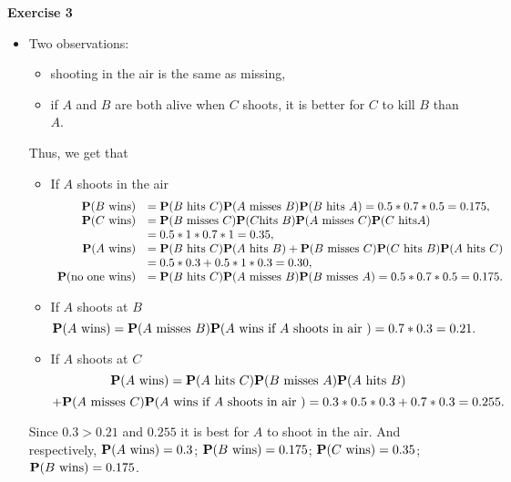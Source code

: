 \documentclass[10pt]{article}
\def\Pr{{\bf P}}
\begin{document}
{\bf Exercise 3}
\begin{itemize}
\item[\empty] Two observations:
\begin{itemize}
\item shooting in the air is the same as missing,
\item if $A$ and $B$ are both alive when $C$ shoots, it is better for $C$ to kill $B$ than $A$.
\end{itemize}
 
Thus, we get that
\begin{itemize}
\item If $A$ shoots in the air
$$
\begin{array}{rl}
\Pr(B\mbox{ wins})&=\Pr(B\mbox{ hits }C)\Pr(A\mbox{ misses } B)\Pr(B\mbox{ hits } A)=0.5*0.7*0.5=0.175,\\
\Pr(C\mbox{ wins})&=\Pr(B\mbox{ misses }C)\Pr(C\mbox{hits } B)\Pr(A\mbox{ misses }C)\Pr(C\mbox{ hits}A)\\
&=0.5*1*0.7*1=0.35,\\
\Pr(A\mbox{ wins})&=\Pr(B\mbox{ hits }C)\Pr(A\mbox{ hits } B)+\Pr(B\mbox{ misses } C)\Pr(C\mbox{ hits }B)\Pr(A\mbox{ hits }C)\\
&=0.5*0.3+0.5*1*0.3=0.30,\\
\Pr(\mbox{no one wins})&=\Pr(B\mbox{ hits }C)\Pr(A\mbox{ misses } B)\Pr(B\mbox{ misses } A)=0.5*0.7*0.5=0.175.
\end{array}$$
\item If $A$ shoots at $B$
$$\Pr(A\mbox{ wins})=\Pr(A \mbox{ misses } B)\Pr(A\mbox{ wins if $A$ shoots in air })=0.7*0.3=0.21.$$ 
\item If $A$ shoots at $C$
$$\Pr(A\mbox{ wins})=\Pr(A\mbox{ hits }C)\Pr(B\mbox{ misses } A)\Pr(A\mbox{ hits }B)$$
$$+\Pr(A\mbox{ misses } C)\Pr(A\mbox{ wins if $A$ shoots in air })=0.3*0.5*0.3+0.7*0.3=0.255.$$
\end{itemize}
Since $0.3>0.21$ and $0.255$ it is best for $A$ to shoot in the air. And respectively, $\Pr(A\mbox{ wins})=0.3$; $\Pr(B\mbox{ wins})=0.175$; $\Pr(C\mbox{ wins})=0.35$;  $\Pr(B\mbox{ wins})=0.175$.
\end{itemize}
\end{document}
